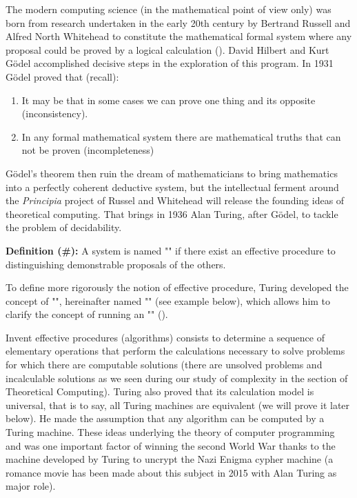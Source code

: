 	The modern computing science (in the mathematical point of view only) was born from research undertaken in the early 20th century by Bertrand Russell and Alfred North Whitehead to constitute the mathematical formal system where any proposal could be proved by a logical calculation (). David Hilbert and Kurt Gödel accomplished decisive steps in the exploration of this program. In 1931 Gödel proved that (recall):
	\begin{enumerate}
		\item It may be that in some cases we can prove one thing and its opposite (inconsistency).
	
		\item In any formal mathematical system there are mathematical truths that can not be proven (incompleteness)
	\end{enumerate}
	Gödel's theorem then  ruin the dream of mathematicians to bring mathematics into a perfectly coherent deductive system, but the intellectual ferment around the \textit{Principia} project of Russel and Whitehead will release the founding ideas of theoretical computing. That brings in 1936 Alan Turing, after Gödel, to tackle the problem of decidability.
	
	\textbf{Definition (\#\mydef):} A system is named "" if there exist an effective procedure to distinguishing demonstrable proposals of the others. 

	To define more rigorously the notion of effective procedure, Turing developed the concept of "", hereinafter named "" (see example below), which allows him to clarify the concept of running an "" ().
	
	Invent effective procedures (algorithms) consists to determine a sequence of elementary operations that perform the calculations necessary to solve problems for which there are computable solutions (there are unsolved problems and incalculable solutions as we seen during our study of complexity in the section of Theoretical Computing). Turing also proved that its calculation model is universal, that is to say, all Turing machines are equivalent (we will prove it later below). He made the assumption that any algorithm can be computed by a Turing machine. These ideas underlying the theory of computer programming and was one important factor of winning the second World War thanks to the machine developed by Turing to uncrypt the Nazi Enigma cypher machine (a romance movie has been made about this subject in 2015 with Alan Turing as major role).

